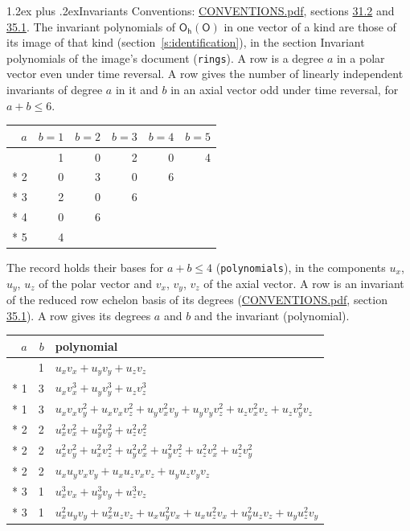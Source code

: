 \documentclass[10pt,a4paper]{article}
\makeatletter
\renewcommand\section{\@startsection{section}{1}{\z@}{-3ex plus -1ex minus -.2ex}%
  {1.2ex plus .2ex}{\normalfont\large\sffamily\bfseries\color{parttitle}}}
\numberwithin{equation}{section}
\newcommand{\grp}[1]{\mathsf{#1}}
\makeatother
\begin{document}
\section{Invariants}\label{s:invariants}
Conventions: \href{../../CONVENTIONS.pdf}{CONVENTIONS.pdf}, sections \href{../../CONVENTIONS.pdf\#conv.31.2}{31.2} and \href{../../CONVENTIONS.pdf\#conv.35.1}{35.1}.
The invariant polynomials of $\grp{O_{h}}(\grp{O})$ in one vector of a kind are those of its image of that kind (section~\ref{s:identification}), in the section Invariant polynomials of the image's document (\texttt{rings}).
\leavevmode\label{n:index.degree.polar}\label{n:index.degree.axial}A row is a degree $a$ in a polar vector even under time reversal. A row gives the number of linearly independent invariants of degree $a$ in it and $b$ in an axial vector odd under time reversal, for $a + b \le 6$.
{\small\begin{longtable}{@{}rrrrrr@{}}\toprule
$a$ & $b = 1$ & $b = 2$ & $b = 3$ & $b = 4$ & $b = 5$\\\midrule\endhead
\bottomrule\endfoot\endlastfoot
1 & 1 & 0 & 2 & 0 & 4\\*
2 & 0 & 3 & 0 & 6 & \\*
3 & 2 & 0 & 6 &  & \\*
4 & 0 & 6 &  &  & \\*
5 & 4 &  &  &  & \\
\bottomrule\end{longtable}}
\leavevmode\label{n:local.component.polar}\label{n:local.component.axial}The record holds their bases for $a + b \le 4$ (\texttt{polynomials}), in the components $u_{x}$, $u_{y}$, $u_{z}$ of the polar vector and $v_{x}$, $v_{y}$, $v_{z}$ of the axial vector. \label{n:head.polynomial}A row is an invariant of the reduced row echelon basis of its degrees (\href{../../CONVENTIONS.pdf}{CONVENTIONS.pdf}, section \href{../../CONVENTIONS.pdf\#conv.35.1}{35.1}). A row gives its degrees $a$ and $b$ and the invariant (polynomial).
{\small\renewcommand{\arraystretch}{1.2}\begin{longtable}{@{}rrl@{}}\toprule
$a$ & $b$ & polynomial\\\midrule\endhead
\bottomrule\endfoot\endlastfoot
1 & 1 & $u_{x}v_{x} + u_{y}v_{y} + u_{z}v_{z}$\\*
1 & 3 & $u_{x}v_{x}^{3} + u_{y}v_{y}^{3} + u_{z}v_{z}^{3}$\\*
1 & 3 & $u_{x}v_{x}v_{y}^{2} + u_{x}v_{x}v_{z}^{2} + u_{y}v_{x}^{2}v_{y} + u_{y}v_{y}v_{z}^{2} + u_{z}v_{x}^{2}v_{z} + u_{z}v_{y}^{2}v_{z}$\\*
2 & 2 & $u_{x}^{2}v_{x}^{2} + u_{y}^{2}v_{y}^{2} + u_{z}^{2}v_{z}^{2}$\\*
2 & 2 & $u_{x}^{2}v_{y}^{2} + u_{x}^{2}v_{z}^{2} + u_{y}^{2}v_{x}^{2} + u_{y}^{2}v_{z}^{2} + u_{z}^{2}v_{x}^{2} + u_{z}^{2}v_{y}^{2}$\\*
2 & 2 & $u_{x}u_{y}v_{x}v_{y} + u_{x}u_{z}v_{x}v_{z} + u_{y}u_{z}v_{y}v_{z}$\\*
3 & 1 & $u_{x}^{3}v_{x} + u_{y}^{3}v_{y} + u_{z}^{3}v_{z}$\\*
3 & 1 & $u_{x}^{2}u_{y}v_{y} + u_{x}^{2}u_{z}v_{z} + u_{x}u_{y}^{2}v_{x} + u_{x}u_{z}^{2}v_{x} + u_{y}^{2}u_{z}v_{z} + u_{y}u_{z}^{2}v_{y}$\\
\bottomrule\end{longtable}}
\end{document}
